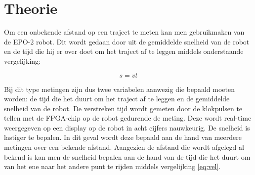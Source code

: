 \documentclass{report}
\begin{document}
\chapter{Theorie}
Om een onbekende afstand op een traject te meten kan men gebruikmaken van de EPO-2 robot. Dit wordt gedaan door uit de gemiddelde snelheid van de robot en de tijd 
die hij er over doet om het traject af te leggen middels onderstaande vergelijking:

\begin{equation}
\label{eq:vel}
s = vt
\end{equation}

Bij dit type metingen zijn dus twee variabelen aanwezig die bepaald moeten worden: de tijd die het duurt om het traject af te leggen en de gemiddelde snelheid van de robot. 
De verstreken tijd wordt gemeten door de klokpulsen te tellen met de FPGA-chip op de robot gedurende de meting. Deze wordt real-time weergegeven op een display op de robot in acht cijfers nauwkeurig.
De snelheid is lastiger te bepalen. In dit geval wordt deze bepaald aan de hand van meerdere metingen over een bekende afstand. Aangezien de afstand die wordt afgelegd al bekend is kan men de snelheid bepalen aan de hand van de tijd die het duurt om van het ene naar het andere punt te rijden middels vergelijking \ref{eq:vel}.\\
\end{document}
